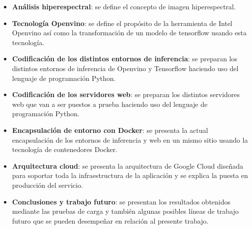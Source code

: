 \begin{itemize}
    \item \textbf{Análisis hiperespectral}: se define el concepto de imagen hiperespectral.
    \item \textbf{Tecnología Openvino}: se define el propósito de la herramienta de Intel Openvino así como la transformación de un modelo de tensorflow usando esta tecnología.
    \item \textbf{Codificación de los distintos entornos de inferencia}: se preparan los distintos entornos de inferencia de Openvino y Tensorflow haciendo uso del lenguaje de programación Python.
    \item \textbf{Codificación de los servidores web}: se preparan los distintos servidores web que van a ser puestos a prueba haciendo uso del lenguaje de programación Python.
    \item \textbf{Encapsulación de entorno con Docker}: se presenta la actual encapsulación de los entornos de inferencia y web en un mismo sitio usando la tecnología de contenedores Docker.
    \item \textbf{Arquitectura cloud}: se presenta la arquitectura de Google Cloud diseñada para soportar toda la infraestructura de la aplicación y se explica la puesta en producción del servicio.
    \item \textbf{Conclusiones y trabajo futuro}: se presentan los resultados obtenidos mediante las pruebas de carga y también algunas posibles líneas de trabajo futuro que se pueden desempeñar en relación al presente trabajo.
\end{itemize}